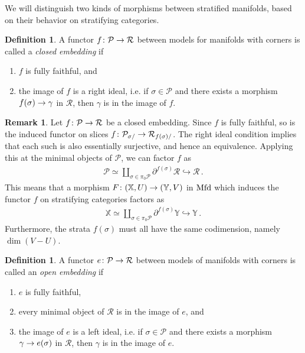 \documentclass[10pt]{amsart}
\numberwithin{equation}{section}
\theoremstyle{definition}
\newtheorem{definition}[prop]{Definition}
\newtheorem{rem}[prop]{Remark}
\newcommand{\Mfd}{\mathrm{Mfd}\vphantom{d}}
\newcommand{\bX}{\mathbb{X}}
\newcommand{\bY}{\mathbb{Y}}
\newcommand{\cP}{\mathcal{P}}
\newcommand{\cR}{\mathcal{R}}
\newcommand{\del}{\partial}
\renewcommand{\to}{\mathchoice{\longrightarrow}{\rightarrow}{}{}}
\begin{document}
We will distinguish two kinds of morphisms between stratified manifolds, based on their behavior on stratifying categories.

\begin{definition}\label{def:closed_embedding}
	A functor $f\colon \cP\to \cR$ between models for manifolds with corners is called a \emph{closed embedding} if
	\begin{enumerate}
		\item $f$ is fully faithful, and
		\item the image of $f$ is a right ideal, i.e. if $\sigma \in \cP$ and there exists a morphism $f(\sigma) \to \gamma$ in $\cR$, then $\gamma$ is in the image of $f$.
	\end{enumerate}
\end{definition}

\begin{rem}\label{rem:unwinding_closed_embedding}
	Let $f\colon \cP \to \cR$ be a closed embedding.
	Since $f$ is fully faithful, so is the induced functor on slices $f\colon \cP_{\sigma/} \to \cR_{f(\sigma)/}$.
	The right ideal condition implies that each such is also essentially surjective, and hence an equivalence. Applying this at the minimal objects of $\cP$, we can factor $f$ as
	\begin{align*}
		\cP \simeq \coprod_{\sigma \in \pi_{0}\cP} \del^{f(\sigma)} \cR \hookrightarrow \cR \,.
	\end{align*}
	This means that a morphism $F\colon (\bX,U) \to (\bY,V)$ in $\Mfd$ which induces the functor $f$ on stratifying categories factors as
	\begin{align*}
		\bX \simeq \coprod_{\sigma \in \pi_{0}\cP} \del^{f(\sigma)} \bY \hookrightarrow \bY \,.
	\end{align*}
	Furthermore, the strata $f(\sigma)$ must all have the same codimension, namely $\dim(V-U)$.
\end{rem}

\begin{definition}\label{def:open_embedding}
	A functor $e\colon  \cP\to \cR$ between models of manifolds with corners is called an \emph{open embedding} if
	\begin{enumerate}
		\item $e$ is fully faithful,
		\item every minimal object of $\cR$ is in the image of $e$, and
		\item the image of $e$ is a left ideal, i.e. if $\sigma\in \cP$ and there exists a morphism $\gamma \to e(\sigma)$ in $\cR$, then $\gamma$ is in the image of $e$.
	\end{enumerate}
\end{definition}
\end{document}

